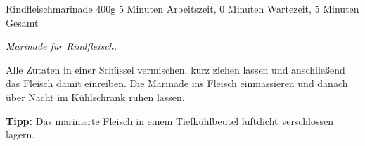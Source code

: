 \begin{recipe}{Rindfleischmarinade} {400g} {5 Minuten Arbeitszeit, 0 Minuten Wartezeit, 5 Minuten Gesamt}

  \freeform{}\textit{Marinade für Rindfleisch.}


  Alle Zutaten in einer Schüssel vermischen, kurz ziehen lassen und anschließend das Fleisch damit einreiben.
  Die Marinade ins Fleisch einmassieren und danach über Nacht im Kühlschrank ruhen lassen.

  \freeform{}\hrulefill{}

  \freeform{}\textbf{Tipp:}
  Das marinierte Fleisch in einem Tiefkühlbeutel luftdicht verschlossen lagern.

\end{recipe}
